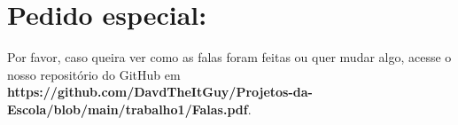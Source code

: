\section{Pedido especial:}
Por favor, caso queira ver como as falas foram feitas ou quer mudar algo, acesse o nosso repositório do GitHub em \textbf{https://github.com/DavdTheItGuy/Projetos-da-Escola/blob/main/trabalho1/Falas.pdf}.
